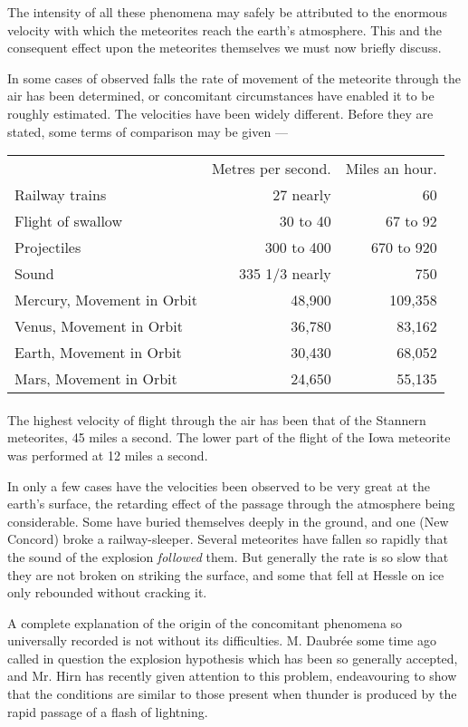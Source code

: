 \documentclass[a4paper, 12pt, oneside, polutonikogreek, english]{article}
\begin{document}
The intensity of all these phenomena may safely be attributed to the enormous velocity with which the meteorites reach the earth's atmosphere. This and the consequent effect upon the meteorites themselves we must now briefly discuss.

In some cases of observed falls the rate of movement of the meteorite through the air has been determined, or concomitant circumstances have enabled it to be roughly estimated. The velocities have been widely different. Before they are stated, some terms of comparison may be given ---
\begin{table}[H]
    \centering
    \begin{tabular}{l r r}
        ~ & Metres per second. & Miles an hour. \\
        Railway trains & 27 nearly & 60 \\
        Flight of swallow & 30 to 40 & 67 to 92 \\
        Projectiles & 300 to 400 & 670 to 920 \\
        Sound & 335 1/3 nearly & 750 \\
        Mercury, Movement in Orbit & 48,900 & 109,358 \\
        Venus, Movement in Orbit & 36,780 & 83,162 \\
        Earth, Movement in Orbit & 30,430 & 68,052 \\
        Mars, Movement in Orbit & 24,650 & 55,135 \\
    \end{tabular}
\end{table}
\paragraph{}
The highest velocity of flight through the air has been that of the Stannern meteorites, 45 miles a second. The lower part of the flight of the Iowa meteorite was performed at 12 miles a second.

In only a few cases have the velocities been observed to be very great at the earth's surface, the retarding effect of the passage through the atmosphere being considerable. Some have buried themselves deeply in the ground, and one (New Concord) broke a railway-sleeper. Several meteorites have fallen so rapidly that the sound of the explosion \emph{followed} them. But generally the rate is so slow that they are not broken on striking the surface, and some that fell at Hessle on ice only rebounded without cracking it.

A complete explanation of the origin of the concomitant phenomena so universally recorded is not without its difficulties. M. Daubrée some time ago called in question the explosion hypothesis which has been so generally accepted, and Mr. Hirn has recently given attention to this problem, endeavouring to show that the conditions are similar to those present when thunder is produced by the rapid passage of a flash of lightning.
\end{document}
